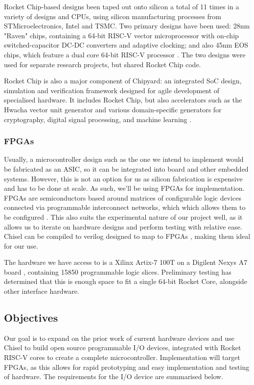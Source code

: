 \documentclass[a4paper,fleqn,12pt]{article}
\begin{document}
Rocket Chip-based designs been taped out onto silicon a total of 11 times in a variety of designs and CPUs, using silicon manufacturing processes from STMicroelectronics, Intel and TSMC. Two primary designs have been used: 28nm "Raven" chips, containing a 64-bit RISC-V
vector microprocessor with on-chip switched-capacitor DC-DC converters and adaptive clocking; and also 45nm EOS chips, which feature a dual core 64-bit RISC-V processor \citep{rv2core}. The two designs were used for separate research projects, but shared Rocket Chip code.

Rocket Chip is also a major component of Chipyard: an integrated SoC design, simulation and verification framework designed for agile development of specialised hardware. It includes Rocket Chip, but also accelerators such as the Hwacha vector unit generator and various domain-specific generators for cryptography, digital signal processing, and machine learning \citep{chipyard}.

\subsubsection{FPGAs}

Usually, a microcontroller design such as the one we intend to implement would be fabricated as an ASIC, so it can be integrated into board and other embedded systems. However, this is not an option for us as silicon fabrication is expensive and has to be done at scale. As such, we'll be using FPGAs for implementation. FPGAs are semiconductors based around matrices of configurable logic devices connected via programmable interconnect networks, which which allows them to be configured  \citep{whatisfpga}. This also suits the experimental nature of our project well, as it allows us to iterate on hardware designs and perform testing with relative ease. Chisel can be compiled to verilog designed to map to FPGAs \citep{chisel}, making them ideal for our use.

The hardware we have access to is a Xilinx Artix-7 100T on a Digilent Nexys A7 board \citep{digilent}, containing 15850 programmable logic slices. Preliminary testing has determined that this is enough space to fit a single 64-bit Rocket Core, alongside other interface hardware.

\subsection{Objectives}
Our goal is to expand on the prior work of current hardware devices and use Chisel to build open source programmable I/O devices, integrated with Rocket RISC-V cores to create a complete microcontroller. Implementation will target FPGAs, as this allows for rapid prototyping and easy implementation and testing of hardware. The requirements for the I/O device are summarised below.
\end{document}
